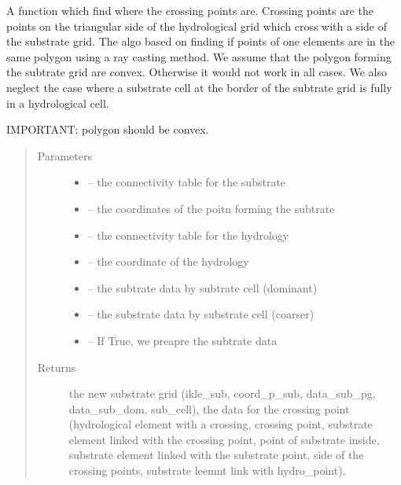 \documentclass[letterpaper,10pt,english]{sphinxmanual}
\begin{document}
\begin{fulllineitems}
\label{\detokenize{index:src.mesh_grid2.find_sub_and_cross}}
A function which find where the crossing points are. Crossing points are the points on the triangular side of the
hydrological grid which cross with a side of the substrate grid. The algo based on finding if points of one elements
are in the same polygon using a ray casting method. We assume that the polygon forming the subtrate grid are convex.
Otherwise it would not work in all cases.
We also neglect the case where a substrate cell at the border of the subtrate grid is fully in a hydrological cell.

IMPORTANT: polygon should be convex.
\begin{quote}\begin{description}
\item[{Parameters}] \leavevmode\begin{itemize}
\item {} 
 -- the connectivity table for the substrate

\item {} 
 -- the coordinates of the poitn forming the subtrate

\item {} 
 -- the connectivity table for the hydrology

\item {} 
 -- the coordinate of the hydrology

\item {} 
 -- the subtrate data by subtrate cell (dominant)

\item {} 
 -- the substrate data by substrate cell (coarser)

\item {} 
 -- If True, we preapre the subtrate data

\end{itemize}

\item[{Returns}] \leavevmode
the new substrate grid (ikle\_sub, coord\_p\_sub, data\_sub\_pg, data\_sub\_dom, sub\_cell), the data for
the crossing point (hydrological element with a crossing, crossing point, substrate element linked with
the crossing point, point of substrate inside, substrate element linked with the substrate point,
side of the crossing points, substrate leemnt link with hydro\_point).

\end{description}\end{quote}

\end{fulllineitems}
\end{document}
